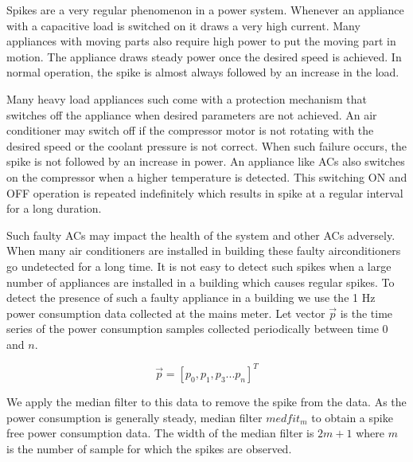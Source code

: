 


Spikes are a very regular phenomenon in a power system. Whenever an appliance with a capacitive load is switched on it draws a very high current. Many appliances with moving parts also require high power to put the moving part in motion. The appliance draws steady power once the desired speed is achieved. In normal operation, the spike is almost always followed by an increase in the load. 

Many heavy load appliances such come with a protection mechanism that switches off the appliance when desired parameters are not achieved. An air conditioner may switch off if the compressor motor is not rotating with the desired speed or the coolant pressure is not correct. When such failure occurs, the spike is not followed by an increase in power. An appliance like ACs also switches on the compressor when a higher temperature is detected. This switching ON and OFF operation is repeated indefinitely which results in spike at a regular interval for a long duration. 

Such faulty ACs may impact the health of the system and other ACs adversely. When many air conditioners are installed in building these faulty airconditioners go undetected for a long time. It is not easy to detect such spikes when a large number of appliances are installed in a building which causes regular spikes. To detect the presence of such a faulty appliance in a building we use the 1 Hz power consumption data collected at the mains meter. Let vector $\vec{p}$ is the time series of the power consumption samples collected periodically between time $0$ and  $n$. 

$$\vec{p} = [ p_0, p_1, p_3 ... p_n  ]^T $$

We apply the median filter to this data to remove the spike from the data. As the power consumption is generally steady, median filter $medfit_m$ to obtain a spike free power consumption data. The width of the median filter is $2 m + 1$ where $m$ is the number of sample for which the spikes are observed. 

